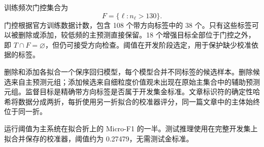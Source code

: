 \documentclass[12pt,a4paper]{article}
\begin{document}
训练频次门控集合为
\begin{equation}
F=\{\ell:n_\ell>130\}.
\label{eq:gate}
\end{equation}
门控根据官方训练数据计数，包含 108 个带方向标签中的 38 个。只有这些标签可以被删除或添加，较低频的主预测直接保留。18 个增强目标全部位于门控之外，即 $T\cap F=\varnothing$，但仍可接受方向检查。阈值在开发阶段选定，用于保护缺少校准依据的标签。

删除和添加各拟合一个保序回归模型，每个模型合并不同标签的候选样本。删除候选来自主预测元组；添加候选来自细粒度价值观未出现在原始主集合中的辅助预测元组。监督目标是精确带方向标签是否属于开发集金标准。文章标识符的确定性哈希将数据分成两折，每折使用另一折拟合的校准器评分，同一篇文章中的主体始终位于同一折。

运行阈值为主系统在拟合折上的 Micro-F1 的一半。测试推理使用在完整开发集上拟合并保存的校准器，阈值约为 0.27479，无需测试金标准。
\end{document}
